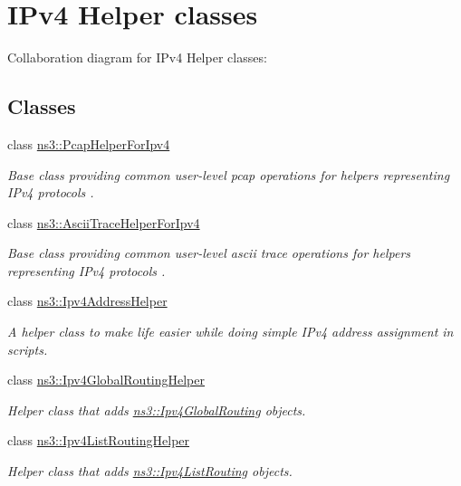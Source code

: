 \hypertarget{group__ipv4Helpers}{}\section{I\+Pv4 Helper classes}
\label{group__ipv4Helpers}
Collaboration diagram for I\+Pv4 Helper classes\+:
\subsection*{Classes}
\begin{DoxyCompactItemize}
\item 
class \hyperlink{classns3_1_1PcapHelperForIpv4}{ns3\+::\+Pcap\+Helper\+For\+Ipv4}
\begin{DoxyCompactList}\small\item\em Base class providing common user-\/level pcap operations for helpers representing I\+Pv4 protocols . \end{DoxyCompactList}\item 
class \hyperlink{classns3_1_1AsciiTraceHelperForIpv4}{ns3\+::\+Ascii\+Trace\+Helper\+For\+Ipv4}
\begin{DoxyCompactList}\small\item\em Base class providing common user-\/level ascii trace operations for helpers representing I\+Pv4 protocols . \end{DoxyCompactList}\item 
class \hyperlink{classns3_1_1Ipv4AddressHelper}{ns3\+::\+Ipv4\+Address\+Helper}
\begin{DoxyCompactList}\small\item\em A helper class to make life easier while doing simple I\+Pv4 address assignment in scripts. \end{DoxyCompactList}\item 
class \hyperlink{classns3_1_1Ipv4GlobalRoutingHelper}{ns3\+::\+Ipv4\+Global\+Routing\+Helper}
\begin{DoxyCompactList}\small\item\em Helper class that adds \hyperlink{classns3_1_1Ipv4GlobalRouting}{ns3\+::\+Ipv4\+Global\+Routing} objects. \end{DoxyCompactList}\item 
class \hyperlink{classns3_1_1Ipv4ListRoutingHelper}{ns3\+::\+Ipv4\+List\+Routing\+Helper}
\begin{DoxyCompactList}\small\item\em Helper class that adds \hyperlink{classns3_1_1Ipv4ListRouting}{ns3\+::\+Ipv4\+List\+Routing} objects. \end{DoxyCompactList}\item 

\end{DoxyCompactItemize}
